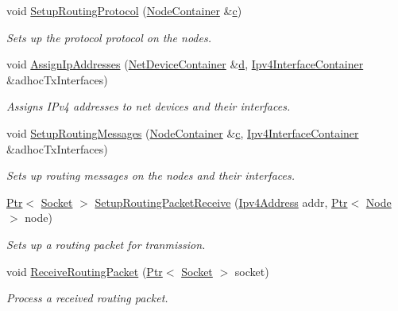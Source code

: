 \begin{DoxyCompactItemize}
\item 
void \hyperlink{classRoutingHelper_a78ef84cd47fa44fd06015e7e157b8404}{Setup\+Routing\+Protocol} (\hyperlink{classns3_1_1NodeContainer}{Node\+Container} \&\hyperlink{mmwave_2model_2fading-traces_2fading__trace__generator_8m_ae0323a9039add2978bf5b49550572c7c}{c})
\begin{DoxyCompactList}\small\item\em Sets up the protocol protocol on the nodes. \end{DoxyCompactList}\item 
void \hyperlink{classRoutingHelper_aa08ca9f06e7e06f95919bb14345750b0}{Assign\+Ip\+Addresses} (\hyperlink{classns3_1_1NetDeviceContainer}{Net\+Device\+Container} \&\hyperlink{lte__pathloss_8m_a1aabac6d068eef6a7bad3fdf50a05cc8}{d}, \hyperlink{classns3_1_1Ipv4InterfaceContainer}{Ipv4\+Interface\+Container} \&adhoc\+Tx\+Interfaces)
\begin{DoxyCompactList}\small\item\em Assigns I\+Pv4 addresses to net devices and their interfaces. \end{DoxyCompactList}\item 
void \hyperlink{classRoutingHelper_a31236f0ad47519ab251f93b9fe13013a}{Setup\+Routing\+Messages} (\hyperlink{classns3_1_1NodeContainer}{Node\+Container} \&\hyperlink{mmwave_2model_2fading-traces_2fading__trace__generator_8m_ae0323a9039add2978bf5b49550572c7c}{c}, \hyperlink{classns3_1_1Ipv4InterfaceContainer}{Ipv4\+Interface\+Container} \&adhoc\+Tx\+Interfaces)
\begin{DoxyCompactList}\small\item\em Sets up routing messages on the nodes and their interfaces. \end{DoxyCompactList}\item 
\hyperlink{classns3_1_1Ptr}{Ptr}$<$ \hyperlink{classns3_1_1Socket}{Socket} $>$ \hyperlink{classRoutingHelper_a58fe834e212745d0f0dcb5909eb02dd8}{Setup\+Routing\+Packet\+Receive} (\hyperlink{classns3_1_1Ipv4Address}{Ipv4\+Address} addr, \hyperlink{classns3_1_1Ptr}{Ptr}$<$ \hyperlink{classns3_1_1Node}{Node} $>$ node)
\begin{DoxyCompactList}\small\item\em Sets up a routing packet for tranmission. \end{DoxyCompactList}\item 
void \hyperlink{classRoutingHelper_afeb815b9dad464539adb7197af8e412f}{Receive\+Routing\+Packet} (\hyperlink{classns3_1_1Ptr}{Ptr}$<$ \hyperlink{classns3_1_1Socket}{Socket} $>$ socket)
\begin{DoxyCompactList}\small\item\em Process a received routing packet. \end{DoxyCompactList}\end{DoxyCompactItemize}

